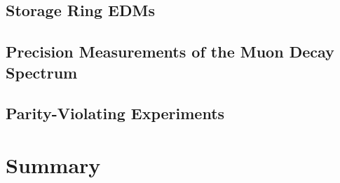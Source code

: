 \subsection{Storage Ring EDMs}


\subsection{Precision Measurements of the Muon Decay Spectrum}


\subsection{Parity-Violating Experiments}\label{sec:cl:pve}


\section{Summary}\label{sec:cl:gm2edmdisc}





